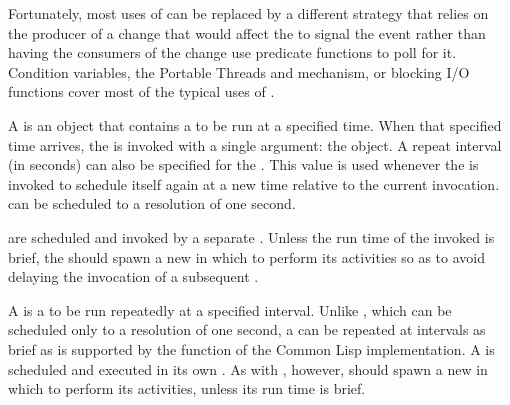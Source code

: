 Fortunately, most uses of  can be replaced by a different
strategy that relies on the producer of a change that would affect the
  to signal the event rather than
having the consumers of the change use predicate functions to poll for it.
Condition variables, the Portable Threads \textbf{}
and \textbf{} mechanism, or blocking I/O functions
cover most of the typical uses of .


A  is an object that contains a  to
be run at a specified time. When that specified time arrives, the
 is invoked with a single argument: the
 object. A repeat interval (in seconds) can also be
specified for the . This value is used whenever the
 is invoked to schedule itself again at a new time
relative to the current invocation.   can be
scheduled to a resolution of one second.

 are scheduled and invoked by a separate
 .  Unless the run time of
the invoked  is brief, the  should spawn a new
 in which to perform its activities so as to avoid delaying the
invocation of a subsequent .


A  is a  to be run repeatedly at a
specified interval.  Unlike , which can be
scheduled only to a resolution of one second, a  can
be repeated at intervals as brief as is supported by the  function
of the Common Lisp implementation.  A  is scheduled
and executed in its own .  As with ,
however,  should spawn a new  in which to
perform its activities, unless its run time is brief.

\W\entities
\T\clearpage


